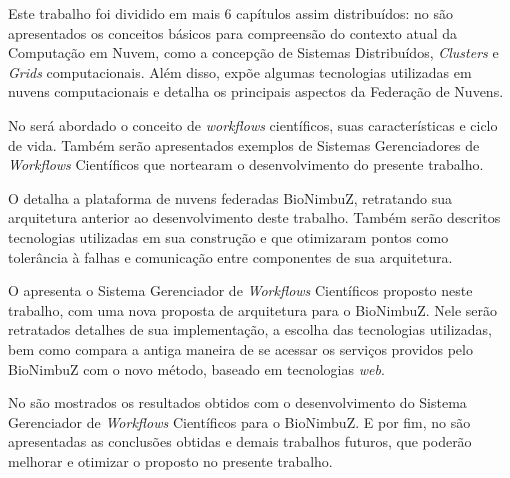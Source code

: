 Este trabalho foi dividido em mais 6 capítulos assim distribuídos: no  são apresentados os conceitos básicos para compreensão do contexto atual da Computação em Nuvem, como a concepção de Sistemas Distribuídos, \textit{Clusters} e \textit{Grids} computacionais. Além disso, expõe algumas tecnologias utilizadas em nuvens computacionais e detalha os principais aspectos da Federação de Nuvens. 

No  será abordado o conceito de \textit{workflows} científicos, suas características e ciclo de vida. Também serão apresentados exemplos de Sistemas Gerenciadores de \textit{Workflows} Científicos que nortearam o desenvolvimento do presente trabalho. 

O  detalha a plataforma de nuvens federadas BioNimbuZ, retratando sua arquitetura anterior ao desenvolvimento deste trabalho. Também serão descritos tecnologias utilizadas em sua construção e que otimizaram pontos como tolerância à falhas e comunicação entre componentes de sua arquitetura.

O  apresenta o Sistema Gerenciador de \textit{Workflows} Científicos proposto neste trabalho, com uma nova proposta de arquitetura para o BioNimbuZ. Nele serão retratados detalhes de sua implementação, a escolha das tecnologias utilizadas, bem como compara a antiga maneira de se acessar os serviços providos pelo BioNimbuZ com o novo método, baseado em tecnologias \textit{web}.

No  são mostrados os resultados obtidos com o desenvolvimento do Sistema Gerenciador de \textit{Workflows} Científicos para o BioNimbuZ. E por fim, no  são apresentadas as conclusões obtidas e demais trabalhos futuros, que poderão melhorar e otimizar o proposto no presente trabalho.



